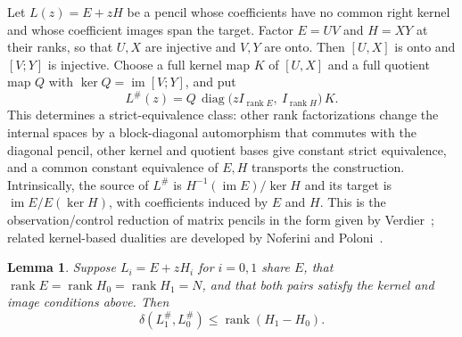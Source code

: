 \documentclass[11pt]{article}
\newtheorem{lemma}{Lemma}
\newcommand{\rk}{\operatorname{rank}}
\newcommand{\im}{\operatorname{im}}
\begin{document}
Let $L(z)=E+zH$ be a pencil whose coefficients have no common right kernel and whose coefficient images span the target. Factor $E=UV$ and $H=XY$ at their ranks, so that $U,X$ are injective and $V,Y$ are onto. Then $[U,X]$ is onto and $[V;Y]$ is injective. Choose a full kernel map $K$ of $[U,X]$ and a full quotient map $Q$ with $\ker Q=\im[V;Y]$, and put
\begin{equation}\label{eq:complement}
L^\#(z)=Q\,\operatorname{diag}\bigl(zI_{\rk E},\ I_{\rk H}\bigr)\,K .
\end{equation}
This determines a strict-equivalence class: other rank factorizations change the internal spaces by a block-diagonal automorphism that commutes with the diagonal pencil, other kernel and quotient bases give constant strict equivalence, and a common constant equivalence of $E,H$ transports the construction. Intrinsically, the source of $L^\#$ is $H^{-1}(\im E)/\ker H$ and its target is $\im E/E(\ker H)$, with coefficients induced by $E$ and $H$. This is the observation/control reduction of matrix pencils in the form given by Verdier~\cite[\S2.2]{Ver17}; related kernel-based dualities are developed by Noferini and Poloni~\cite{NP15}.

\begin{lemma}\label{lem:contract}
Suppose $L_i=E+zH_i$ for $i=0,1$ share $E$, that $\rk E=\rk H_0=\rk H_1=N$, and that both pairs satisfy the kernel and image conditions above. Then
\begin{equation}\label{eq:contract}
\delta(L_1^\#,L_0^\#)\le\rk(H_1-H_0).
\end{equation}
\end{lemma}
\end{document}
